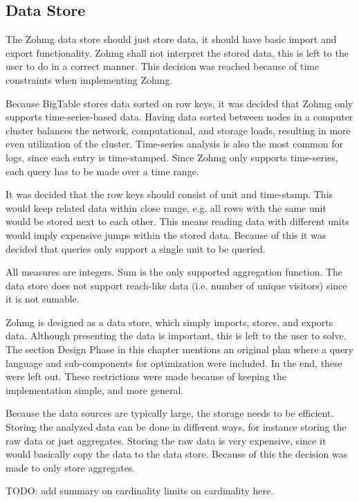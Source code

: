 \subsection*{Data Store}

The Zohmg data store should just store data, it should have basic import
and export functionality. Zohmg shall not interpret the stored data, this is
left to the user to do in a correct manner. This decision was reached because of
time constraints when implementing Zohmg.

Because BigTable stores data sorted on row keys, it was decided that Zohmg only
supports time-series-based data. Having data sorted between nodes in a computer
cluster balances the network, computational, and storage loads, resulting in
more even utilization of the cluster. Time-series analysis is also the most
common for logs, since each entry is time-stamped. \cite{discoveringweb} Since
Zohmg only supports time-series, each query has to be made over a time range.

It was decided that the row keys should consist of unit and time-stamp. This
would keep related data within close range, e.g. all rows with the same unit
would be stored next to each other. This means reading data with different units
would imply expensive jumps within the stored data. Because of this it was
decided that queries only support a single unit to be queried.

All measures are integers. Sum is the only supported aggregation function. The
data store does not support reach-like data (i.e. number of unique visitors)
since it is not sumable.

Zohmg is designed as a data store, which simply imports, stores, and exports
data. Although presenting the data is important, this is left to the user to
solve. The section Design Phase in this chapter mentions an original plan where
a query language and sub-components for optimization were included. In the end,
these were left out. These restrictions were made because of keeping the
implementation simple, and more general.

Because the data sources are typically large, the storage needs to be efficient.
Storing the analyzed data can be done in different ways, for instance storing
the raw data or just aggregates. Storing the raw data is very expensive, since
it would basically copy the data to the data store. Because of this the decision
was made to only store aggregates.

TODO: add summary on cardinality limits on cardinality here.


